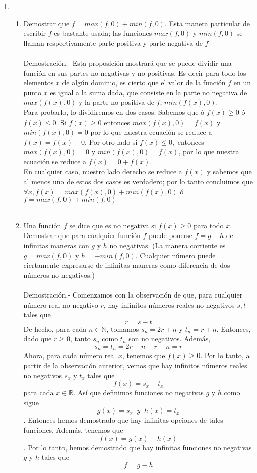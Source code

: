 \begin{enumerate}[\bfseries 1.]
	\item 

	\begin{enumerate}[\bfseries (a)]
	    
	    \item Demostrar que $f=max(f,0)+min(f,0)$. Esta manera particular de escribir $f$ es bastante usada; las funciones $max(f,0)$ y $min(f,0)$ se llaman respectivamente parte positiva y parte negativa de $f$\\\\
	    Demostración.-\; Esta proposición mostrará que se puede dividir una función en sus partes no negativas y no positivas. Es decir para todo los elementos $x$ de algún dominio, es cierto que el valor de la función $f$ en un punto $x$ es igual a la suma dada, que consiste en la parte no negativa de $max(f(x),0)$ y la parte no positiva de $f$, $min(f(x),0)$.\\
	    Para probarlo, lo dividiremos en dos casos. Sabemos que ó $f(x)\geq 0$ ó $f(x)\leq 0$. Si $f(x)\geq 0$ entonces $max(f(x),0)=f(x)$ y $min(f(x),0)=0$ por lo que nuestra ecuación se reduce a $f(x)=f(x)+0$. Por otro lado si $f(x)\leq 0,$ entonces $max(f(x),0)=0$ y $min(f(x),0)=f(x)$, por lo que nuestra ecuación se reduce a $f(x)=0+f(x)$.\\
	    En cualquier caso, nuestro lado derecho se reduce a $f(x)$ y sabemos que al menos uno de estos dos casos es verdadero; por lo tanto concluimos que $\forall x, f(x)= max(f(x),0)+min(f(x),0)$ ó $f=max (f,0)+min(f,0)$\\\\

	    \item Una función $f$ se dice que es no negativa si $f(x)\geq 0$ para todo $x$. Demostrar que para cualquier función $f$ puede ponerse $f=g-h$ de infinitas maneras con $g$ y $h$ no negativas. (La manera corriente es $g=max(f,0)$ y $h=-min(f,0)$. Cualquier número puede ciertamente expresarse de infinitas maneras como diferencia de dos números no negativos.)\\\\
	    Demostración.-\; Comenzamos con la observación de que, para cualquier número real no negativo $r$, hay infinitos números reales no negativos $s, t$ tales que $$r=s-t$$ De hecho, para cada $n \in \mathbb{N}$, tomamos $s_n = 2r + n$ y $t_n = r + n$. Entonces, dado que $r\geq 0$, tanto $s_n$ como $t_n$ son no negativos. Además, $$s_n=t_n=2r+n-r-n=r$$ Ahora, para cada número real $x$, tenemos que $f(x)\geq  0$. Por lo tanto, a partir de la observación anterior, vemos que hay infinitos números reales no negativos $s_x$ y $t_x$ tales que $$f(x)=s_x-t_x$$ para cada $x \in \mathbb{R}$. Así que definimos funciones no negativas $g$ y $h$ como sigue $$g(x)=s_x\;\; y \;\; h(x)=t_x$$. Entonces hemos demostrado que hay infinitas opciones de tales funciones. Además, tenemos que $$f(x)=g(x)-h(x)$$. Por lo tanto, hemos demostrado que hay infinitas funciones no negativas $g$ y $h$ tales que $$f = g-h$$\\\\


\end{enumerate}
\end{enumerate}
